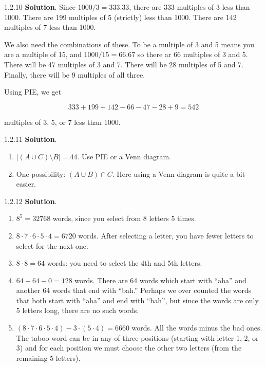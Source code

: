 \documentclass[11pt,]{book}
\theoremstyle{ptxplainnotitle}
\theoremstyle{ptxplaintitle}
\theoremstyle{ptxdefinitionnotitle}
\theoremstyle{ptxdefinitiontitle}
\theoremstyle{ptxdefinitionnotitle}
\theoremstyle{ptxdefinitiontitle}
\theoremstyle{ptxdefinitionnotitle}
\theoremstyle{ptxdefinitiontitle}
\theoremstyle{ptxdefinitiontitlenonumber}
\theoremstyle{ptxdefinitiontitlenonumber}
\numberwithin{equation}{chapter}
\newcommand{\card}[1]{\left| #1 \right|}
\begin{document}
\begin{divisionexercise}{1.2.10}
\textbf{Solution}.\quad%
\hypertarget{p-1213}{}%
Since \(1000/3 = 333.33\text{,}\) there are 333 multiples of 3 less than 1000.  There are 199 multiples of 5 (strictly) less than 1000.  There are 142 multiples of 7 less than 1000.%
\par
\hypertarget{p-1214}{}%
We also need the combinations of these.  To be a multiple of 3 and 5 means you are a multiple of 15, and \(1000/15 = 66.67\) so there ar 66 multiples of 3 and 5.  There will be 47 multiples of 3 and 7.  There will be 28 multiples of 5 and 7.  Finally, there will be 9 multiples of all three.%
\par
\hypertarget{p-1215}{}%
Using PIE, we get%
\par
\hypertarget{p-1216}{}%
%
\begin{equation*}
333+199 + 142 - 66 - 47 - 28 + 9 = 542
\end{equation*}
%
\par
\hypertarget{p-1217}{}%
multiples of 3, 5, or 7 less than 1000.%
\end{divisionexercise}%
\begin{divisionexercise}{1.2.11}
\textbf{Solution}.\quad%
\hypertarget{p-1219}{}%
\leavevmode%
\begin{enumerate}[label=(\alph*)]
\item\hypertarget{li-515}{}\(\card{(A \cup C)\setminus B} = 44\). Use PIE or a Venn diagram.%
\item\hypertarget{li-516}{}One possibility: \((A \cup B) \cap C\).  Here using a Venn diagram is quite a bit easier.%
\end{enumerate}
%
\end{divisionexercise}%
\begin{divisionexercise}{1.2.12}
\textbf{Solution}.\quad%
\hypertarget{p-1244}{}%
\leavevmode%
\begin{enumerate}[label=\alph*.]
\item\hypertarget{li-532}{}\hypertarget{p-1245}{}%
\(8^5 = 32768\) words, since you select from 8 letters 5 times.%
\item\hypertarget{li-533}{}\hypertarget{p-1246}{}%
\(8\cdot 7\cdot 6\cdot 5\cdot 4 = 6720\) words. After selecting a letter, you have fewer letters to select for the next one.%
\item\hypertarget{li-534}{}\hypertarget{p-1247}{}%
\(8 \cdot 8 =64\) words: you need to select the 4th and 5th letters.%
\item\hypertarget{li-535}{}\hypertarget{p-1248}{}%
\(64 + 64 - 0 = 128\) words. There are 64 words which start with ``aha'' and another 64 words that end with ``bah.'' Perhaps we over counted the words that both start with ``aha'' and end with ``bah'', but since the words are only 5 letters long, there are no such words.%
\item\hypertarget{li-536}{}\hypertarget{p-1249}{}%
\((8\cdot 7\cdot 6\cdot 5\cdot 4) - 3\cdot (5\cdot 4) = 6660\) words. All the words minus the bad ones. The taboo word can be in any of three positions (starting with letter 1, 2, or 3) and for each position we must choose the other two letters (from the remaining 5 letters).%
\end{enumerate}
%
\end{divisionexercise}%
\end{document}
